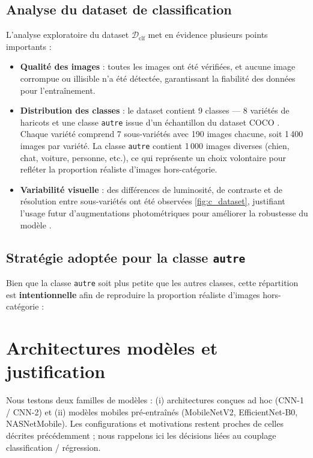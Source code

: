 \subsection{Analyse du dataset de classification}

L'analyse exploratoire du dataset \(\mathcal{D}_{\text{clf}}\) met en évidence plusieurs points importants :

\begin{itemize}
	\item \textbf{Qualité des images} : toutes les images ont été vérifiées, et aucune image corrompue ou illisible n’a été détectée, garantissant la fiabilité des données pour l’entraînement.
	\item \textbf{Distribution des classes} : le dataset contient 9 classes — 8 variétés de haricots et une classe \texttt{autre} issue d’un échantillon du dataset COCO \cite{lin2014microsoft}. Chaque variété comprend 7 sous-variétés avec 190 images chacune, soit 1 400 images par variété. La classe \texttt{autre} contient 1 000 images diverses (chien, chat, voiture, personne, etc.), ce qui représente un choix volontaire pour refléter la proportion réaliste d’images hors-catégorie.
	\item \textbf{Variabilité visuelle} : des différences de luminosité, de contraste et de résolution entre sous-variétés ont été observées \ref{fig:c_dataset}, justifiant l’usage futur d’augmentations photométriques pour améliorer la robustesse du modèle \cite{shorten2019survey}.
\end{itemize}

\subsection{Stratégie adoptée pour la classe \texttt{autre}}

Bien que la classe \texttt{autre} soit plus petite que les autres classes, cette répartition est \textbf{intentionnelle} afin de reproduire la proportion réaliste d’images hors-catégorie :

\section{Architectures modèles et justification}

Nous testons deux familles de modèles : (i) architectures conçues ad hoc (CNN-1 / CNN-2) et (ii) modèles mobiles pré-entraînés (MobileNetV2, EfficientNet-B0, NASNetMobile). Les configurations et motivations restent proches de celles décrites précédemment ; nous rappelons ici les décisions liées au couplage classification / régression.

